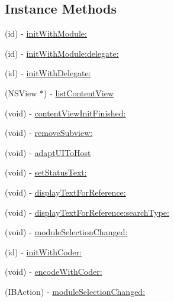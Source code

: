 \subsection*{Instance Methods}
\begin{DoxyCompactItemize}
\item 
(id) -\/ \hyperlink{interface_gen_book_view_controller_a0f1b0abe7143e44c899d26cb3bca3ca1}{init\-With\-Module\-:}
\item 
(id) -\/ \hyperlink{interface_gen_book_view_controller_a461586be13fdd403ddadcb93fd4a6ae2}{init\-With\-Module\-:delegate\-:}
\item 
(id) -\/ \hyperlink{interface_gen_book_view_controller_a31987d71b58e0520588676a4f6896d2c}{init\-With\-Delegate\-:}
\item 
(N\-S\-View $\ast$) -\/ \hyperlink{interface_gen_book_view_controller_a726ea6c924bda6200d37751ca723d7b5}{list\-Content\-View}
\item 
(void) -\/ \hyperlink{interface_gen_book_view_controller_a0bd73ec236f8055ac6566b39ddf66add}{content\-View\-Init\-Finished\-:}
\item 
(void) -\/ \hyperlink{interface_gen_book_view_controller_afc97bbb7e9b0d2f6b9fd995ada16f4a1}{remove\-Subview\-:}
\item 
(void) -\/ \hyperlink{interface_gen_book_view_controller_acda22137b423344be66ad81dd4efc461}{adapt\-U\-I\-To\-Host}
\item 
(void) -\/ \hyperlink{interface_gen_book_view_controller_a86f5fa035efb2e0d568cf4cf9e621358}{set\-Status\-Text\-:}
\item 
(void) -\/ \hyperlink{interface_gen_book_view_controller_aee0469066a38e5b41b9de3e4e87fe05b}{display\-Text\-For\-Reference\-:}
\item 
(void) -\/ \hyperlink{interface_gen_book_view_controller_aee0f4fccfed1c999da9746c4a8ed6fc0}{display\-Text\-For\-Reference\-:search\-Type\-:}
\item 
(void) -\/ \hyperlink{interface_gen_book_view_controller_a97e40f01cf327aaf426740112764e170}{module\-Selection\-Changed\-:}
\item 
(id) -\/ \hyperlink{interface_gen_book_view_controller_a6cf57c30ef62d8a0b74eafd74d0f8b39}{init\-With\-Coder\-:}
\item 
(void) -\/ \hyperlink{interface_gen_book_view_controller_a958c5e82e2f22a1a132161999b5d1704}{encode\-With\-Coder\-:}
\item 
(I\-B\-Action) -\/ \hyperlink{interface_gen_book_view_controller_a97e40f01cf327aaf426740112764e170}{module\-Selection\-Changed\-:}
\end{DoxyCompactItemize}
